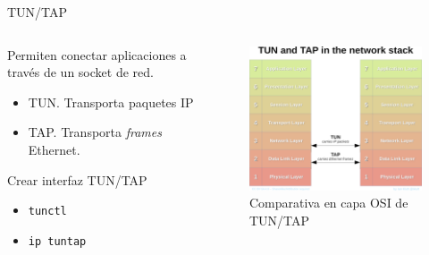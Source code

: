 \documentclass[aspectratio=169,xcolor=dvipsnames]{beamer}
\begin{document}
	\begin{frame}{TUN/TAP}
	    \begin{columns}
	        \begin{column}{0.5\textwidth}
	            Permiten conectar aplicaciones a través de un socket de red.
	            \begin{itemize}
	                \item TUN. Transporta paquetes IP
	                \item TAP. Transporta \textit{frames} Ethernet.
	            \end{itemize}
	            
	            \begin{exampleblock}{Crear interfaz TUN/TAP}
	                \begin{itemize}
	                    \item \texttt{tunctl}
	                    \item \texttt{ip tuntap}
	                \end{itemize}
	            \end{exampleblock}
	        \end{column}
	        
	        \begin{column}{0.5\textwidth}
	                \begin{figure}[h]
                        \includegraphics[width=1\textwidth]{img/tun_vs_tap.png}
                        \caption{Comparativa en capa OSI de TUN/TAP}
                    \end{figure}
	        \end{column}
	    \end{columns}
	\end{frame}
	
\end{document}
